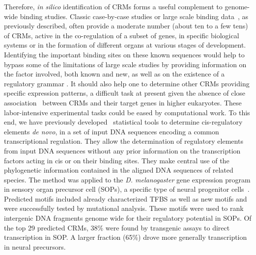 \documentclass[a4,center,fleqn]{NAR}
\begin{document}
\enlargethispage{-65.1pt}

Therefore, {\em in silico} identification of CRMs  forms a useful complement to
genome-wide binding studies. 
Classic case-by-case studies or large scale binding data~\cite{Visel:2009fr},
as  previously described, often provide a moderate number (about ten to a few
tens) of CRMs, active  in the co-regulation of a subset of genes, in specific
biological systems or in the formation of different  organs at various stages
of development. 
Identifying the important binding sites on these known sequences would help to
bypass some of the limitations of large scale studies by providing information
on the factor involved, both known and new, as well as on the existence of
a  regulatory grammar \cite{arnosti}.
It should also help one to determine other CRMs providing specific expression
patterns, a difficult task at present given the absence of close
association~\cite{pmid19097946} between CRMs and their target genes in higher
eukaryotes.
These labor-intensive experimental tasks could be eased by computational work.
To this end,  we have previously developed~\cite{Rouault:2010fk} statistical
tools to determine cis-regulatory elements \textit{de novo}, in a set of input
DNA sequences encoding a common transcriptional regulation.
They allow the determination of regulatory elements from input DNA sequences
without any  prior information on the transcription factors acting in cis or on
their binding sites. 
They make  central use of  the phylogenetic information
contained in the aligned DNA sequences of related species.
The method was applied to the {\em D. melanogaster} gene expression program in
sensory organ precursor cell (SOPs), a specific type of neural progenitor
cells~\cite{Rouault:2010fk}.
Predicted motifs  included already characterized TFBS as well as new motifs and
were successfully tested by mutational analysis.
These motifs were used to rank intergenic DNA fragments genome wide for their
regulatory potential in SOPs.
Of the top 29 predicted CRMs, 38\% were found by transgenic assays to direct
transcription in SOP. A larger fraction (65\%) drove more generally
transcription in neural precursors.
 
\end{document}

